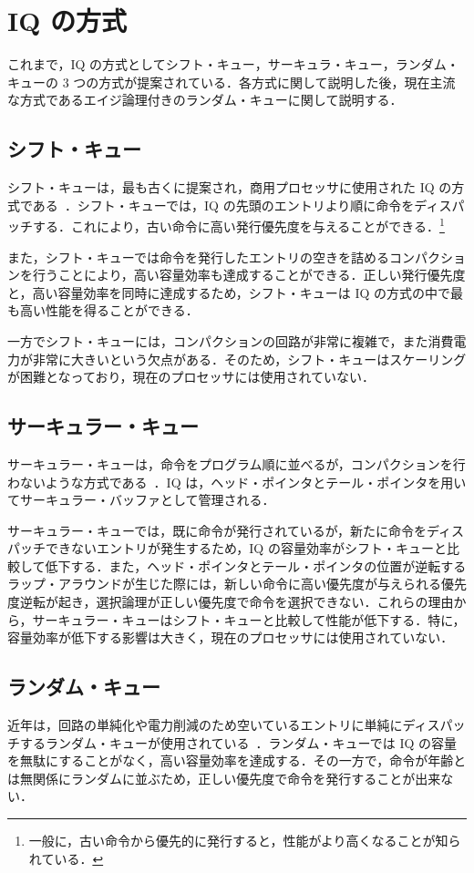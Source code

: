 \section{IQ の方式}
\label{sec:iq_scheme}
これまで，IQ の方式としてシフト・キュー，サーキュラ・キュー，ランダム・キューの 3 つの方式が提案されている．各方式に関して説明した後，現在主流な方式であるエイジ論理付きのランダム・キューに関して説明する．

\subsection{シフト・キュー}
シフト・キューは，最も古くに提案され，商用プロセッサに使用された IQ の方式である~\cite{Farrell1998}．シフト・キューでは，IQ の先頭のエントリより順に命令をディスパッチする．これにより，古い命令に高い発行優先度を与えることができる．\footnote{一般に，古い命令から優先的に発行すると，性能がより高くなることが知られている．}

また，シフト・キューでは命令を発行したエントリの空きを詰めるコンパクションを行うことにより，高い容量効率も達成することができる．正しい発行優先度と，高い容量効率を同時に達成するため，シフト・キューは IQ の方式の中で最も高い性能を得ることができる．

一方でシフト・キューには，コンパクションの回路が非常に複雑で，また消費電力が非常に大きいという欠点がある．そのため，シフト・キューはスケーリングが困難となっており，現在のプロセッサには使用されていない．

\subsection{サーキュラー・キュー}
サーキュラー・キューは，命令をプログラム順に並べるが，コンパクションを行わないような方式である~\cite{Abella:survey2003}．IQ は，ヘッド・ポインタとテール・ポインタを用いてサーキュラー・バッファとして管理される．

サーキュラー・キューでは，既に命令が発行されているが，新たに命令をディスパッチできないエントリが発生するため，IQ の容量効率がシフト・キューと比較して低下する．また，ヘッド・ポインタとテール・ポインタの位置が逆転するラップ・アラウンドが生じた際には，新しい命令に高い優先度が与えられる優先度逆転が起き，選択論理が正しい優先度で命令を選択できない．これらの理由から，サーキュラー・キューはシフト・キューと比較して性能が低下する．特に，容量効率が低下する影響は大きく，現在のプロセッサには使用されていない．

\subsection{ランダム・キュー}
近年は，回路の単純化や電力削減のため空いているエントリに単純にディスパッチするランダム・キューが使用されている~\cite{Alpha21464, AMD-Bulldozer, IBM-Power8}．ランダム・キューでは IQ の容量を無駄にすることがなく，高い容量効率を達成する．その一方で，命令が年齢とは無関係にランダムに並ぶため，正しい優先度で命令を発行することが出来ない．


